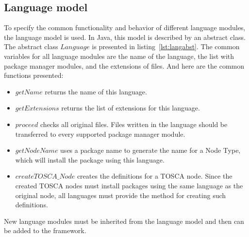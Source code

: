 \subsection*{Language model}
To specify the common functionality and behavior of different language modules, the language model is used. 
In Java, this model is described by an abstract class. 
The abstract class $Language$ is presented in listing~\ref{lst:langabst}.
The common variables for all language modules are the name of the language, the list with package manager modules, and the extensions of files.
And here are the common functions presented: 
\begin{itemize}
	\item $getName$ returns the name of this language.
	\item $getExtensions$ returns the list of extensions for this language.
	\item $proceed$ checks all original files.  
	Files written in the language should be transferred to every supported package manager module.
	\item $getNodeName$ uses a package name to generate the name for a Node Type, which will install the package using this language.
	\item $createTOSCA\_Node$ creates the definitions for a TOSCA node. 
	Since the created TOSCA nodes must install packages using the same language as the original node, all languages must provide the method for creating such definitions.
\end{itemize}
New language modules must be inherited from the language model and then can be added to the framework.

